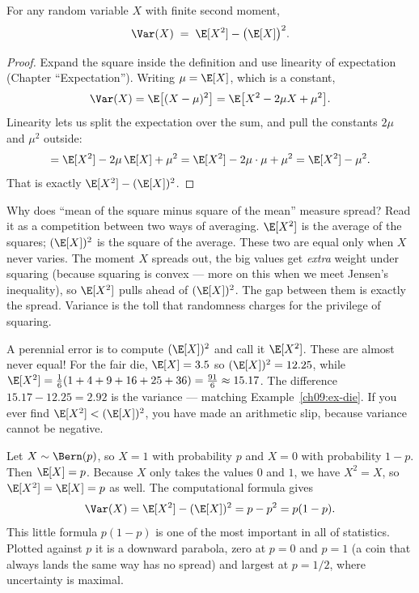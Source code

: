 \begin{theorem}
\label{ch09:thm-comp}
For any random variable $X$ with finite second moment,
\[
  \Var(X) \;=\; \E[X^2] - \big(\E[X]\big)^2.
\]
\end{theorem}

\begin{proof}
Expand the square inside the definition and use linearity of expectation
(Chapter ``Expectation''). Writing $\mu = \E[X]$, which is a constant,
\[
  \Var(X) = \E\big[(X-\mu)^2\big]
  = \E\big[X^2 - 2\mu X + \mu^2\big].
\]
Linearity lets us split the expectation over the sum, and pull the constants
$2\mu$ and $\mu^2$ outside:
\[
  = \E[X^2] - 2\mu\,\E[X] + \mu^2
  = \E[X^2] - 2\mu\cdot\mu + \mu^2
  = \E[X^2] - \mu^2.
\]
That is exactly $\E[X^2] - (\E[X])^2$. \qedhere
\end{proof}

\begin{whybox}
Why does ``mean of the square minus square of the mean'' measure spread? Read
it as a competition between two ways of averaging. $\E[X^2]$ is the average of
the squares; $(\E[X])^2$ is the square of the average. These two are equal
only when $X$ never varies. The moment $X$ spreads out, the big values get
\emph{extra} weight under squaring (because squaring is convex --- more on
this when we meet Jensen's inequality), so $\E[X^2]$ pulls ahead of
$(\E[X])^2$. The gap between them is exactly the spread. Variance is the toll
that randomness charges for the privilege of squaring.
\end{whybox}

\begin{trapbox}
A perennial error is to compute $(\E[X])^2$ and call it $\E[X^2]$. These are
almost never equal! For the fair die, $\E[X]=3.5$ so $(\E[X])^2 = 12.25$,
while $\E[X^2] = \tfrac16(1+4+9+16+25+36) = \tfrac{91}{6} \approx 15.17$. The
difference $15.17 - 12.25 = 2.92$ is the variance --- matching
Example~\ref{ch09:ex-die}. If you ever find $\E[X^2] < (\E[X])^2$, you have
made an arithmetic slip, because variance cannot be negative.
\end{trapbox}

\begin{example}
\label{ch09:ex-bern}
Let $X \sim \Bern(p)$, so $X=1$ with probability $p$ and $X=0$ with
probability $1-p$. Then $\E[X] = p$. Because $X$ only takes the values $0$ and
$1$, we have $X^2 = X$, so $\E[X^2] = \E[X] = p$ as well. The computational
formula gives
\[
  \Var(X) = \E[X^2] - (\E[X])^2 = p - p^2 = p(1-p).
\]
This little formula $p(1-p)$ is one of the most important in all of
statistics. Plotted against $p$ it is a downward parabola, zero at $p=0$ and
$p=1$ (a coin that always lands the same way has no spread) and largest at
$p=1/2$, where uncertainty is maximal.
\end{example}

